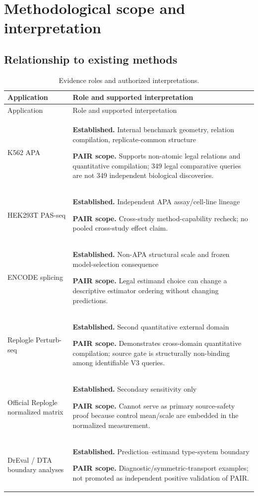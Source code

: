 \documentclass[11pt]{article}
\newcommand{\method}{PAIR\xspace}\newcommand{\pairkg}{PAIR-KG\xspace}\newcommand{\paireval}{PAIR-Eval\xspace}
\begin{document}
\section{Methodological scope and interpretation}


\subsection{Relationship to existing methods}
\begingroup\small
\begin{longtable}{@{}>{\raggedright\arraybackslash}p{}>{\raggedright\arraybackslash}p{}@{}}
\caption{Evidence roles and authorized interpretations.}\\
\toprule
Application & Role and supported interpretation \\
\midrule
\endfirsthead
\toprule
Application & Role and supported interpretation \\
\midrule
\endhead
K562 APA & \textbf{Established.} Internal benchmark geometry, relation compilation, replicate-common structure \par\smallskip\textbf{PAIR scope.} Supports non-atomic legal relations and quantitative compilation; 349 legal comparative queries are not 349 independent biological discoveries.  \\
HEK293T PAS-seq & \textbf{Established.} Independent APA assay/cell-line lineage \par\smallskip\textbf{PAIR scope.} Cross-study method-capability recheck; no pooled cross-study effect claim.  \\
ENCODE splicing & \textbf{Established.} Non-APA structural scale and frozen model-selection consequence \par\smallskip\textbf{PAIR scope.} Legal estimand choice can change a descriptive estimator ordering without changing predictions.  \\
Replogle Perturb-seq & \textbf{Established.} Second quantitative external domain \par\smallskip\textbf{PAIR scope.} Demonstrates cross-domain quantitative compilation; source gate is structurally non-binding among identifiable V3 queries.  \\
Official Replogle normalized matrix & \textbf{Established.} Secondary sensitivity only \par\smallskip\textbf{PAIR scope.} Cannot serve as primary source-safety proof because control mean/scale are embedded in the normalized measurement.  \\*
DrEval / DTA boundary analyses & \textbf{Established.} Prediction--estimand type-system boundary \par\smallskip\textbf{PAIR scope.} Diagnostic/symmetric-transport examples; not promoted as independent positive validation of \method.  \\
\bottomrule
\end{longtable}
\endgroup
\end{document}
